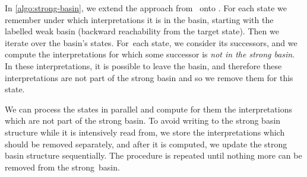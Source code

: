 \begin{algorithm}
  \caption{Parallel strong basin computation.}
  \label{algo:strong-basin}
\end{algorithm}

In \autoref{algo:strong-basin}, we extend the approach from~\cite{Paul2018CMSB} onto \PBN{}. For each state we remember under which interpretations it is in the basin, starting with the labelled weak basin (backward reachability from the target state). Then we iterate over the basin's states. For~each state, we consider its successors, and we compute the interpretations for which some successor is \emph{not in the strong basin}. In these interpretations, it is possible to leave the basin, and therefore these interpretations are not part of the strong basin and so we remove them for this state. 

We can process the states in parallel and compute for them the interpretations which are not part of the strong basin. To avoid writing to the strong basin structure while it is intensively read from, we store the interpretations which should be removed separately, and after it is computed, we update the strong basin structure sequentially. The procedure is repeated until nothing more can be removed from the strong~basin.


